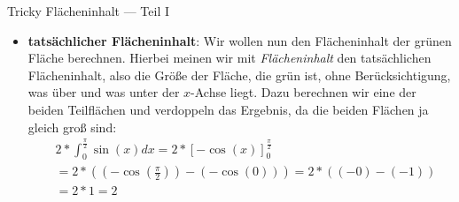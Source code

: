 \begin{bla}{Tricky Flächeninhalt --- Teil I}
\begin{itemize}
    \item \textbf{tatsächlicher Flächeninhalt}: Wir wollen nun den Flächeninhalt der grünen Fläche berechnen. Hierbei meinen wir mit \emph{Flächeninhalt} den tatsächlichen Flächeninhalt, also die Größe der Fläche, die grün ist, ohne Berücksichtigung, was über und was unter der $x$-Achse liegt. Dazu berechnen wir eine der beiden Teilflächen und verdoppeln das Ergebnis, da die beiden Flächen ja gleich groß sind:
    \begin{equation*}
      \begin{split}
        & 2*\int_{0}^{\frac{\pi}{2}} \sin(x)dx = 2*{[-\cos(x)]}_{0}^{\frac{\pi}{2}} \\
        &= 2*( (-\cos(\frac{\pi}{2})) - (-\cos(0)) ) = 2*( (-0)-(-1) ) \\
        &= 2*1=2
      \end{split}
    \end{equation*}
  \end{itemize}
\end{bla}


